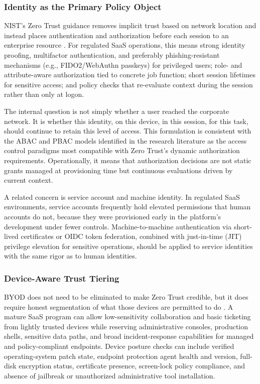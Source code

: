 \documentclass[acmlarge]{acmart}
\begin{document}
\subsubsection{Identity as the Primary Policy Object}

NIST's Zero Trust guidance removes implicit trust based on network location and instead
places authentication and authorization before each session to an enterprise resource
\cite{rose2020}. For regulated SaaS operations, this means strong identity proofing,
multifactor authentication, and preferably phishing-resistant mechanisms (e.g.,
FIDO2/WebAuthn passkeys) for privileged users; role- and attribute-aware authorization
tied to concrete job function; short session lifetimes for sensitive access; and policy
checks that re-evaluate context during the session rather than only at logon.

The internal question is not simply whether a user reached the corporate network. It is
whether this identity, on this device, in this session, for this task, should continue to
retain this level of access. This formulation is consistent with the ABAC and PBAC models
identified in the research literature \cite{hu2014} as the access control paradigms most
compatible with Zero Trust's dynamic authorization requirements. Operationally, it means
that authorization decisions are not static grants managed at provisioning time but
continuous evaluations driven by current context.

A related concern is service account and machine identity. In regulated SaaS environments,
service accounts frequently hold elevated permissions that human accounts do not, because
they were provisioned early in the platform's development under fewer controls.
Machine-to-machine authentication via short-lived certificates or OIDC token federation,
combined with just-in-time (JIT) privilege elevation for sensitive operations, should be
applied to service identities with the same rigor as to human identities.

\subsubsection{Device-Aware Trust Tiering}

BYOD does not need to be eliminated to make Zero Trust credible, but it does require
honest segmentation of what those devices are permitted to do \cite{balasubramanian2021}.
A mature SaaS program can allow low-sensitivity collaboration and basic ticketing from
lightly trusted devices while reserving administrative consoles, production shells,
sensitive data paths, and broad incident-response capabilities for managed and
policy-compliant endpoints. Device posture checks can include verified operating-system
patch state, endpoint protection agent health and version, full-disk encryption status,
certificate presence, screen-lock policy compliance, and absence of jailbreak or
unauthorized administrative tool installation.
\end{document}
